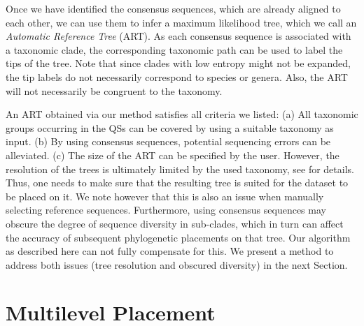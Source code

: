 Once we have identified the consensus sequences, which are already aligned to each other,
we can use them to infer a maximum likelihood tree, which we call an \emph{Automatic Reference Tree} (ART).
As each consensus sequence is associated with a taxonomic clade,
the corresponding taxonomic path can be used to label the tips of the tree.
Note that since clades with low entropy might not be expanded, the tip labels do not necessarily correspond to species or genera.
Also, the ART will not necessarily be congruent to the taxonomy.

An ART obtained via our method satisfies all criteria we listed:
(a) All taxonomic groups occurring in the \acp{QS} can be covered by using a suitable taxonomy as input.
(b) By using consensus sequences, potential sequencing errors can be alleviated.
(c) The size of the ART can be specified by the user.
However, the resolution of the trees is ultimately limited by the used taxonomy,
see  for details.
Thus, one needs to make sure that the resulting tree is suited for the dataset to be placed on it.
We note however that this is also an issue when manually selecting reference sequences.
Furthermore, using consensus sequences may obscure the degree of sequence diversity in sub-clades,
which in turn can affect the accuracy of subsequent phylogenetic placements on that tree.
Our algorithm as described here can not fully compensate for this.
We present a method to address both issues (tree resolution and obscured diversity) in the next Section.


\section{Multilevel Placement}
\label{ch:AutomaticTrees:sec:MultilevelPlacement}


